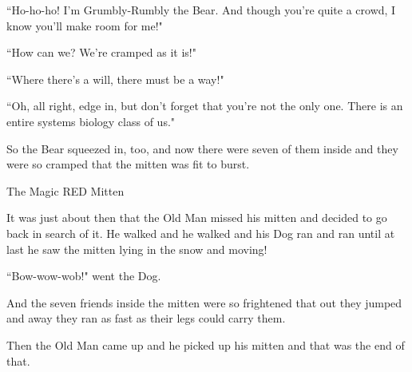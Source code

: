 \documentclass{article}
\begin{document}
``Ho-ho-ho! I'm Grumbly-Rumbly the Bear. And though you're quite a crowd, I know you'll make room for me!"

``How can we? We're cramped as it is!"

``Where there's a will, there must be a way!"

``Oh, all right, edge in, but don't forget that you're not the only one. There is an entire systems biology class of us."

So the Bear squeezed in, too, and now there were seven of them inside and they were so cramped that the mitten was fit to burst.

The Magic RED Mitten

It was just about then that the Old Man missed his mitten and decided to go back in search of it. He walked and he walked and his Dog ran and ran until at last he saw the mitten lying in the snow and moving!

``Bow-wow-wob!" went the Dog.

And the seven friends inside the mitten were so frightened that out they jumped and away they ran as fast as their legs could carry them.

Then the Old Man came up and he picked up his mitten and that was the end of that.
\end{document}
